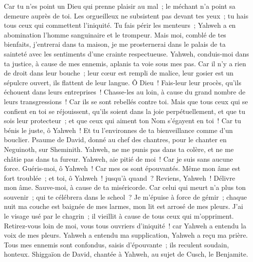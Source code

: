 \begin{multicols}{2}
Car tu n'es point un Dieu qui prenne plaisir au mal~; le méchant n'a point sa demeure auprès de toi.
Les orgueilleux ne subsistent pas devant tes yeux~; tu hais tous ceux qui commettent l'iniquité.
Tu fais périr les menteurs~; Yahweh a en abomination l'homme sanguinaire et le trompeur.
Mais moi, comblé de tes bienfaits, j'entrerai dans ta maison, je me prosternerai dans le palais de ta sainteté avec les sentiments d'une crainte respectueuse.
Yahweh, conduis-moi dans ta justice, à cause de mes ennemis, aplanis ta voie sous mes pas.
Car il n'y a rien de droit dans leur bouche~; leur cœur est rempli de malice, leur gosier est un sépulcre ouvert, ils flattent de leur langue.
Ô Dieu~! Fais-leur leur procès, qu'ils échouent dans leurs entreprises~! Chasse-les au loin, à cause du grand nombre de leurs transgressions~! Car ils se sont rebellés contre toi.
Mais que tous ceux qui se confient en toi se réjouissent, qu'ils soient dans la joie perpétuellement, et que tu sois leur protecteur~; et que ceux qui aiment ton Nom s'égayent en toi~!
Car tu bénis le juste, ô Yahweh~! Et tu l'environnes de ta bienveillance comme d'un bouclier.
\VerseOne{}Psaume de David, donné au chef des chantres, pour le chanter en Neguinoth, sur Sheminith.
Yahweh, ne me punis pas dans ta colère, et ne me châtie pas dans ta fureur.
Yahweh, aie pitié de moi~! Car je suis sans aucune force. Guéris-moi, ô Yahweh~! Car mes os sont épouvantés.
Même mon âme est fort troublée~; et toi, ô Yahweh~! jusqu'à quand~?
Reviens, Yahweh~! Délivre mon âme. Sauve-moi, à cause de ta miséricorde.
Car celui qui meurt n'a plus ton souvenir~; qui te célébrera dans le scheol~?
Je m'épuise à force de gémir~; chaque nuit ma couche est baignée de mes larmes, mon lit est arrosé de mes pleurs.
J'ai le visage usé par le chagrin~; il vieillit à cause de tous ceux qui m'oppriment.
Retirez-vous loin de moi, vous tous ouvriers d'iniquité~! car Yahweh a entendu la voix de mes pleurs.
Yahweh a entendu ma supplication, Yahweh a reçu ma prière.
Tous mes ennemis sont confondus, saisis d'épouvante~; ils reculent soudain, honteux.
\VerseOne{}Shiggaïon de David, chantée à Yahweh, au sujet de Cusch, le Benjamite.

\end{multicols}
